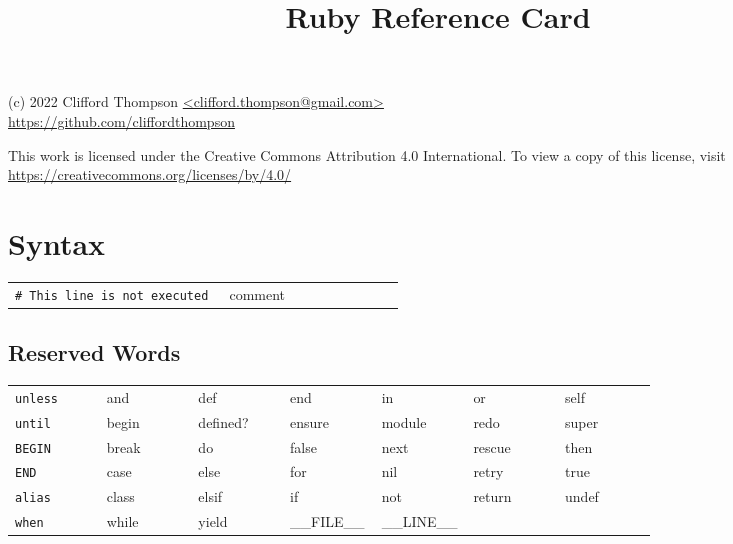 \documentclass[6pt]{article}
\begin{document}
\raggedright
\footnotesize
\begin{multicols}{3}

  \title{Ruby Reference Card}

  {\scriptsize
    (c) 2022 Clifford Thompson \url{<clifford.thompson@gmail.com>}\\
    \url{https://github.com/cliffordthompson}

    This work is licensed under the Creative Commons Attribution 4.0 International.
    To view a copy of this license, visit
    \url{https://creativecommons.org/licenses/by/4.0/}
  }

  \section{Syntax}
  \begin{tabular}{L{0.55\linewidth} L{0.45\linewidth}}
    \tt \# This line is not executed & comment \\
  \end{tabular}

  \subsection{Reserved Words}
  \begin{tabular}{L{0.14\linewidth} L{0.14\linewidth} L{0.14\linewidth} L{0.14\linewidth} L{0.14\linewidth} L{0.14\linewidth} L{0.14\linewidth}}
    \tt unless & and & def & end & in & or & self \\
    \tt until & begin & defined? & ensure & module & redo & super \\
    \tt BEGIN & break & do & false & next & rescue & then \\
    \tt END & case & else & for & nil & retry & true \\
    \tt alias & class & elsif & if & not & return & undef \\
    \tt when & while & yield & {\scriptsize \_\_FILE\_\_} & {\scriptsize\_\_LINE\_\_} & &\\
  \end{tabular}


\end{multicols}
\end{document}
